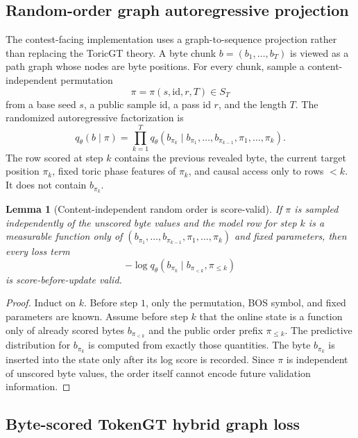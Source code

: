 \documentclass[11pt]{article}
\theoremstyle{definition}
\theoremstyle{plain}
\newtheorem{lemma}[definition]{Lemma}
\theoremstyle{remark}
\numberwithin{equation}{section}
\begin{document}
\subsection{Random-order graph autoregressive projection}

The contest-facing implementation uses a graph-to-sequence projection rather than replacing the ToricGT theory.  A byte chunk $b=(b_1,\ldots,b_T)$ is viewed as a path graph whose nodes are byte positions.  For every chunk, sample a content-independent permutation
\begin{equation}
  \pi=\pi(s,\mathrm{id},r,T)\in S_T
\end{equation}
from a base seed $s$, a public sample id, a pass id $r$, and the length $T$.  The randomized autoregressive factorization is
\begin{equation}
  q_\theta(b\mid \pi)=\prod_{k=1}^T q_\theta\left(b_{\pi_k}\mid b_{\pi_1},\ldots,b_{\pi_{k-1}},\pi_1,\ldots,\pi_k\right).
\end{equation}
The row scored at step $k$ contains the previous revealed byte, the current target position $\pi_k$, fixed toric phase features of $\pi_k$, and causal access only to rows $<k$.  It does not contain $b_{\pi_k}$.

\begin{lemma}[Content-independent random order is score-valid]
If $\pi$ is sampled independently of the unscored byte values and the model row for step $k$ is a measurable function only of $(b_{\pi_1},\ldots,b_{\pi_{k-1}},\pi_1,\ldots,\pi_k)$ and fixed parameters, then every loss term
\begin{equation}
  -\log q_\theta(b_{\pi_k}\mid b_{\pi_{<k}},\pi_{\le k})
\end{equation}
is score-before-update valid.
\end{lemma}

\begin{proof}
Induct on $k$.  Before step $1$, only the permutation, BOS symbol, and fixed parameters are known.  Assume before step $k$ that the online state is a function only of already scored bytes $b_{\pi_{<k}}$ and the public order prefix $\pi_{\le k}$.  The predictive distribution for $b_{\pi_k}$ is computed from exactly those quantities.  The byte $b_{\pi_k}$ is inserted into the state only after its log score is recorded.  Since $\pi$ is independent of unscored byte values, the order itself cannot encode future validation information.
\end{proof}

\subsection{Byte-scored TokenGT hybrid graph loss}
\end{document}
